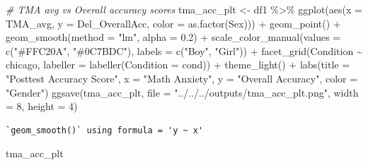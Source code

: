 \documentclass[
  letterpaper,
  DIV=11,
  numbers=noendperiod]{scrartcl}
\newenvironment{Shaded}{\begin{snugshade}}{\end{snugshade}}
\newcommand{\AttributeTok}[1]{\textcolor[rgb]{0.49,0.56,0.16}{#1}}
\newcommand{\CommentTok}[1]{\textcolor[rgb]{0.38,0.63,0.69}{\textit{#1}}}
\newcommand{\DecValTok}[1]{\textcolor[rgb]{0.25,0.63,0.44}{#1}}
\newcommand{\FloatTok}[1]{\textcolor[rgb]{0.25,0.63,0.44}{#1}}
\newcommand{\FunctionTok}[1]{\textcolor[rgb]{0.02,0.16,0.49}{#1}}
\newcommand{\NormalTok}[1]{\textcolor[rgb]{0.00,0.44,0.13}{#1}}
\newcommand{\OtherTok}[1]{\textcolor[rgb]{0.00,0.44,0.13}{#1}}
\newcommand{\SpecialCharTok}[1]{\textcolor[rgb]{0.25,0.44,0.63}{#1}}
\newcommand{\StringTok}[1]{\textcolor[rgb]{0.25,0.44,0.63}{#1}}
\begin{document}
\begin{Shaded}
\begin{Highlighting}[]
\CommentTok{\# TMA avg vs Overall accuracy scores}
\NormalTok{tma\_acc\_plt }\OtherTok{\textless{}{-}}\NormalTok{ df1 }\SpecialCharTok{\%\textgreater{}\%} \FunctionTok{ggplot}\NormalTok{(}\FunctionTok{aes}\NormalTok{(}\AttributeTok{x =}\NormalTok{ TMA\_avg, }
                                  \AttributeTok{y =}\NormalTok{ Del\_OverallAcc, }
                   \AttributeTok{color =} \FunctionTok{as.factor}\NormalTok{(Sex))) }\SpecialCharTok{+}
  \FunctionTok{geom\_point}\NormalTok{() }\SpecialCharTok{+} \FunctionTok{geom\_smooth}\NormalTok{(}\AttributeTok{method =} \StringTok{"lm"}\NormalTok{, }\AttributeTok{alpha =} \FloatTok{0.2}\NormalTok{) }\SpecialCharTok{+}
  \FunctionTok{scale\_color\_manual}\NormalTok{(}\AttributeTok{values =} \FunctionTok{c}\NormalTok{(}\StringTok{"\#FFC20A"}\NormalTok{, }\StringTok{"\#0C7BDC"}\NormalTok{), }
                     \AttributeTok{labels =} \FunctionTok{c}\NormalTok{(}\StringTok{"Boy"}\NormalTok{, }\StringTok{"Girl"}\NormalTok{)) }\SpecialCharTok{+}
  \FunctionTok{facet\_grid}\NormalTok{(Condition }\SpecialCharTok{\textasciitilde{}}\NormalTok{ chicago, }
             \AttributeTok{labeller =} \FunctionTok{labeller}\NormalTok{(}\AttributeTok{Condition =}\NormalTok{ cond)) }\SpecialCharTok{+}
  \FunctionTok{theme\_light}\NormalTok{() }\SpecialCharTok{+}
  \FunctionTok{labs}\NormalTok{(}\AttributeTok{title =} \StringTok{"Posttest Accuracy Score"}\NormalTok{, }
       \AttributeTok{x =} \StringTok{"Math Anxiety"}\NormalTok{, }\AttributeTok{y =} \StringTok{"Overall Accuracy"}\NormalTok{, }\AttributeTok{color =} \StringTok{"Gender"}\NormalTok{) }
\FunctionTok{ggsave}\NormalTok{(tma\_acc\_plt, }\AttributeTok{file =}  \StringTok{"../../../outputs/tma\_acc\_plt.png"}\NormalTok{,}
       \AttributeTok{width =} \DecValTok{8}\NormalTok{, }\AttributeTok{height =} \DecValTok{4}\NormalTok{)}
\end{Highlighting}
\end{Shaded}

\begin{verbatim}
`geom_smooth()` using formula = 'y ~ x'
\end{verbatim}

\begin{Shaded}
\begin{Highlighting}[]
\NormalTok{tma\_acc\_plt}
\end{Highlighting}
\end{Shaded}
\end{document}
